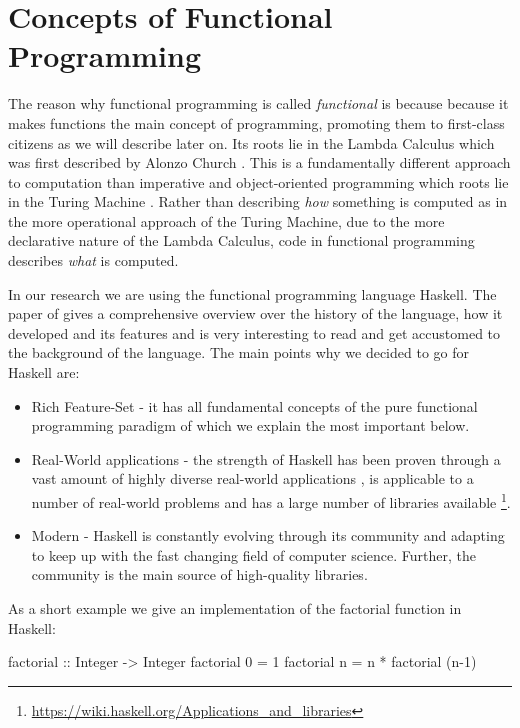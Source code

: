 \section{Concepts of Functional Programming}
The reason why functional programming is called \textit{functional} is because because it makes functions the main concept of programming, promoting them to first-class citizens as we will describe later on. Its roots lie in the Lambda Calculus which was first described by Alonzo Church \citep{church_unsolvable_1936}. This is a fundamentally different approach to computation than imperative and object-oriented programming which roots lie in the Turing Machine \citep{turing_computable_1937}. Rather than describing \textit{how} something is computed as in the more operational approach of the Turing Machine, due to the more declarative nature of the Lambda Calculus, code in functional programming describes \textit{what} is computed.

In our research we are using the functional programming language Haskell. The paper of \citep{hudak_history_2007} gives a comprehensive overview over the history of the language, how it developed and its features and is very interesting to read and get accustomed to the background of the language. The main points why we decided to go for Haskell are:

\begin{itemize}
	\item Rich Feature-Set - it has all fundamental concepts of the pure functional programming paradigm of which we explain the most important below.
	\item Real-World applications - the strength of Haskell has been proven through a vast amount of highly diverse real-world applications \cite{hudak_history_2007}, is applicable to a number of real-world problems \cite{osullivan_real_2008} and has a large number of libraries available \footnote{\url{https://wiki.haskell.org/Applications_and_libraries}}.
	\item Modern - Haskell is constantly evolving through its community and adapting to keep up with the fast changing field of computer science. Further, the community is the main source of high-quality libraries.
\end{itemize}

As a short example we give an implementation of the factorial function in Haskell:
\begin{HaskellCode}
factorial :: Integer -> Integer
factorial 0 = 1
factorial n = n * factorial (n-1)
\end{HaskellCode}

